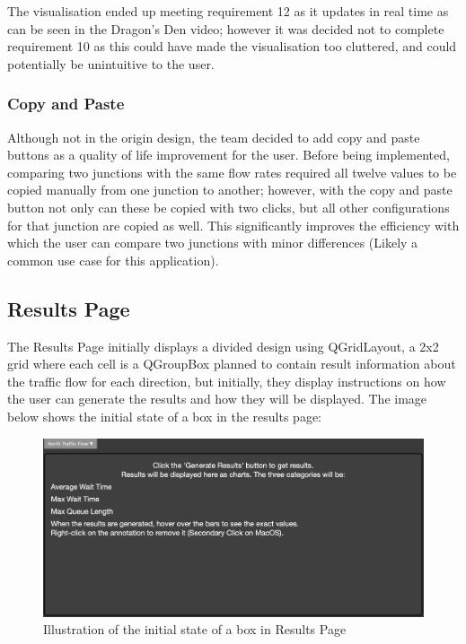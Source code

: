 \documentclass{article}
\begin{document}
    The visualisation ended up meeting requirement 12 as it updates in real time as can be seen in the Dragon's Den video; however it was decided not to complete requirement 10 as this could have made the visualisation too cluttered, and could potentially be unintuitive to the user.

    \subsubsection{Copy and Paste}
    Although not in the origin design, the team decided to add copy and paste buttons as a quality of life improvement for the user.
    Before being implemented, comparing two junctions with the same flow rates required all twelve values to be copied manually from one junction to another; however, with the copy and paste button not only can these be copied with two clicks, but all other configurations for that junction are copied as well.
    This significantly improves the efficiency with which the user can compare two junctions with minor differences (Likely a common use case for this application).

    \subsection{Results Page}

    The Results Page initially displays a divided design using QGridLayout, a 2x2 grid where each cell is a QGroupBox planned to contain result information about the traffic flow for each direction, but initially,
    they display instructions on how the user can generate the results and how they will be displayed. The image below shows the initial state of a box in the results page:

    \begin{figure}[H]
        \centering
        \includegraphics[width=\textwidth]{results1}
        \caption{Illustration of the initial state of a box in Results Page}
        \label{fig:results1}
    \end{figure}
\end{document}
